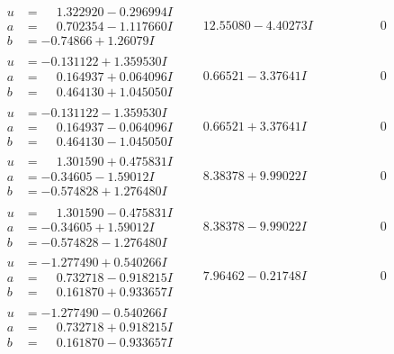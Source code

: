 \documentclass[1p]{elsarticle_modified}
\theoremstyle{definition}
\begin{document}
$$\begin{array}{c|c|c}
\begin{aligned}
u &= \phantom{-}1.322920 - 0.296994 I \\
a &= \phantom{-}0.702354 - 1.117660 I \\
b &= -0.74866 + 1.26079 I\end{aligned}
 & \phantom{-}12.55080 - 4.40273 I & \phantom{-0.000000 } 0 \\ \hline\begin{aligned}
u &= -0.131122 + 1.359530 I \\
a &= \phantom{-}0.164937 + 0.064096 I \\
b &= \phantom{-}0.464130 + 1.045050 I\end{aligned}
 & \phantom{-}0.66521 - 3.37641 I & \phantom{-0.000000 } 0 \\ \hline\begin{aligned}
u &= -0.131122 - 1.359530 I \\
a &= \phantom{-}0.164937 - 0.064096 I \\
b &= \phantom{-}0.464130 - 1.045050 I\end{aligned}
 & \phantom{-}0.66521 + 3.37641 I & \phantom{-0.000000 } 0 \\ \hline\begin{aligned}
u &= \phantom{-}1.301590 + 0.475831 I \\
a &= -0.34605 - 1.59012 I \\
b &= -0.574828 + 1.276480 I\end{aligned}
 & \phantom{-}8.38378 + 9.99022 I & \phantom{-0.000000 } 0 \\ \hline\begin{aligned}
u &= \phantom{-}1.301590 - 0.475831 I \\
a &= -0.34605 + 1.59012 I \\
b &= -0.574828 - 1.276480 I\end{aligned}
 & \phantom{-}8.38378 - 9.99022 I & \phantom{-0.000000 } 0 \\ \hline\begin{aligned}
u &= -1.277490 + 0.540266 I \\
a &= \phantom{-}0.732718 - 0.918215 I \\
b &= \phantom{-}0.161870 + 0.933657 I\end{aligned}
 & \phantom{-}7.96462 - 0.21748 I & \phantom{-0.000000 } 0 \\ \hline\begin{aligned}
u &= -1.277490 - 0.540266 I \\
a &= \phantom{-}0.732718 + 0.918215 I \\
b &= \phantom{-}0.161870 - 0.933657 I\end{aligned}

\end{array}$$
\end{document}
